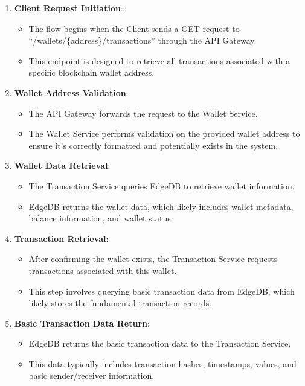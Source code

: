 \begin{enumerate}
    \item \textbf{Client Request Initiation}:
    \begin{itemize}
        \item The flow begins when the Client sends a GET request to ``/wallets/\{address\}/transactions'' through the API Gateway.
        \item This endpoint is designed to retrieve all transactions associated with a specific blockchain wallet address.
    \end{itemize}
    
    \item \textbf{Wallet Address Validation}:
    \begin{itemize}
        \item The API Gateway forwards the request to the Wallet Service.
        \item The Wallet Service performs validation on the provided wallet address to ensure it's correctly formatted and potentially exists in the system.
    \end{itemize}
    
    \item \textbf{Wallet Data Retrieval}:
    \begin{itemize}
        \item The Transaction Service queries EdgeDB to retrieve wallet information.
        \item EdgeDB returns the wallet data, which likely includes wallet metadata, balance information, and wallet status.
    \end{itemize}
    
    \item \textbf{Transaction Retrieval}:
    \begin{itemize}
        \item After confirming the wallet exists, the Transaction Service requests transactions associated with this wallet.
        \item This step involves querying basic transaction data from EdgeDB, which likely stores the fundamental transaction records.
    \end{itemize}
    
    \item \textbf{Basic Transaction Data Return}:
    \begin{itemize}
        \item EdgeDB returns the basic transaction data to the Transaction Service.
        \item This data typically includes transaction hashes, timestamps, values, and basic sender/receiver information.
    \end{itemize}
    

\end{enumerate}
